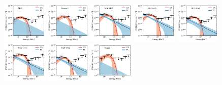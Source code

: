 \documentclass[doublespace,nopageskip]{VTthesis} %
\begin{document}
\begin{appendices}
\begin{figure}
\includegraphics[width=0.19\textwidth]{Figures/Globular/spectra/2comp_8.pdf}
\includegraphics[width=0.19\textwidth]{Figures/Globular/spectra/2comp_28.pdf}
\includegraphics[width=0.19\textwidth]{Figures/Globular/spectra/2comp_18.pdf}
\includegraphics[width=0.19\textwidth]{Figures/Globular/spectra/2comp_19.pdf}
\includegraphics[width=0.19\textwidth]{Figures/Globular/spectra/2comp_22.pdf}
\includegraphics[width=0.19\textwidth]{Figures/Globular/spectra/2comp_13.pdf}
\includegraphics[width=0.19\textwidth]{Figures/Globular/spectra/2comp_24.pdf}
\includegraphics[width=0.19\textwidth]{Figures/Globular/spectra/2comp_27.pdf}

\end{figure}
\end{appendices}
\end{document}
